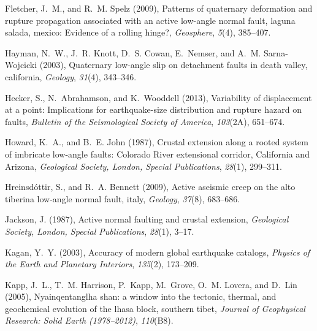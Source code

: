 \documentclass[draft,grl]{AGUTeX}
\begin{document}
\begin{article}
\begin{thebibliography}{29}
Fletcher, J.~M., and R.~M. Spelz (2009), Patterns of quaternary deformation and
  rupture propagation associated with an active low-angle normal fault, laguna
  salada, mexico: Evidence of a rolling hinge?, \textit{Geosphere},
  \textit{5}(4), 385--407.

Hayman, N.~W., J.~R. Knott, D.~S. Cowan, E.~Nemser, and A.~M. Sarna-Wojcicki
  (2003), Quaternary low-angle slip on detachment faults in death valley,
  california, \textit{Geology}, \textit{31}(4), 343--346.

Hecker, S., N.~Abrahamson, and K.~Wooddell (2013), Variability of displacement
  at a point: Implications for earthquake-size distribution and rupture hazard
  on faults, \textit{Bulletin of the Seismological Society of America},
  \textit{103}(2A), 651--674.

Howard, K.~A., and B.~E. John (1987), Crustal extension along a rooted system
  of imbricate low-angle faults: {Colorado River} extensional corridor,
  {California} and {Arizona}, \textit{Geological Society, London, Special
  Publications}, \textit{28}(1), 299--311.

Hreinsd{\'o}ttir, S., and R.~A. Bennett (2009), Active aseismic creep on the
  alto tiberina low-angle normal fault, italy, \textit{Geology},
  \textit{37}(8), 683--686.

Jackson, J. (1987), Active normal faulting and crustal extension,
  \textit{Geological Society, London, Special Publications}, \textit{28}(1),
  3--17.

Kagan, Y.~Y. (2003), Accuracy of modern global earthquake catalogs,
  \textit{Physics of the Earth and Planetary Interiors}, \textit{135}(2),
  173--209.

Kapp, J.~L., T.~M. Harrison, P.~Kapp, M.~Grove, O.~M. Lovera, and D.~Lin
  (2005), Nyainqentanglha shan: a window into the tectonic, thermal, and
  geochemical evolution of the lhasa block, southern tibet, \textit{Journal of
  Geophysical Research: Solid Earth (1978--2012)}, \textit{110}(B8).


\end{thebibliography}
\end{article}
\end{document}
